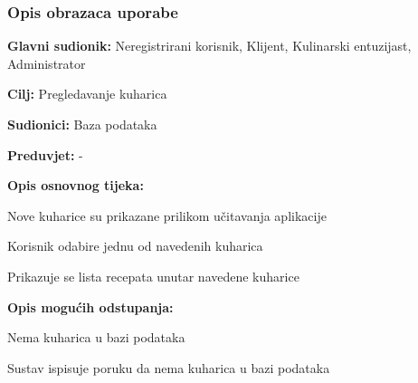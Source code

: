 				\subsubsection{Opis obrazaca uporabe}
					\noindent {}
					\begin{packed_item}
	
						\item \textbf{Glavni sudionik: }Neregistrirani korisnik, Klijent, Kulinarski entuzijast, Administrator
						\item  \textbf{Cilj:} Pregledavanje kuharica
						\item  \textbf{Sudionici:} Baza podataka
						\item  \textbf{Preduvjet:} -
						\item  \textbf{Opis osnovnog tijeka:} 
						
						\item[] \begin{packed_enum}
	
							\item Nove kuharice su prikazane prilikom učitavanja aplikacije
							\item Korisnik odabire jednu od navedenih kuharica
							\item Prikazuje se lista recepata unutar navedene kuharice
						\end{packed_enum}
						
						\item  \textbf{Opis mogućih odstupanja:}
						
						\item[] \begin{packed_item}
	
							\item[2.a] Nema kuharica u bazi podataka
							\item[] \begin{packed_enum}
								
								\item Sustav ispisuje poruku da nema kuharica u bazi podataka
								
							\end{packed_enum}

							
						\end{packed_item}
					\end{packed_item}



